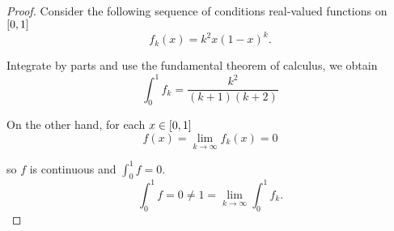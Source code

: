 \begin{proof}
    Consider the following sequence of conditions real-valued functions on $\left[{0, 1}\right]$
    \[
        f_{k}(x) = k^{2}x{(1 - x)}^{k}.
    \]

    Integrate by parts and use the fundamental theorem of calculus, we obtain
    \[
        \int^{1}_{0}f_{k} = \frac{k^{2}}{(k + 1)(k + 2)}
    \]

    On the other hand, for each $x\in\left[{0, 1}\right]$
    \[
        f(x) = \lim\limits_{k\to\infty}f_{k}(x) = 0
    \]

    so $f$ is continuous and $\int^{1}_{0}f = 0$.
    \[
        \int^{1}_{0}f = 0 \ne 1 = \lim\limits_{k\to\infty}\int^{1}_{0}f_{k}.
    \]
\end{proof}
\newpage
